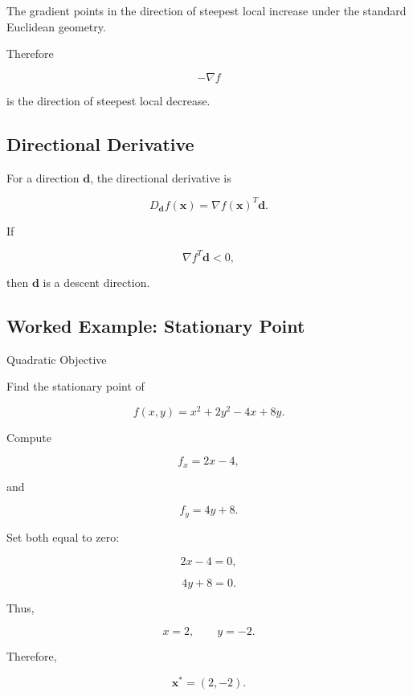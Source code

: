 The gradient points in the direction of steepest local increase under the
standard Euclidean geometry.

Therefore

\[
\boxed{
-\nabla f
}
\]

is the direction of steepest local decrease.

\subsection{Directional Derivative}
\label{subsec:optimization-directional-derivative}

For a direction \(\mathbf{d}\), the directional derivative is

\[
\boxed{
D_{\mathbf{d}}f(\mathbf{x})
=
\nabla f(\mathbf{x})^T\mathbf{d}.
}
\]

If

\[
\nabla f^T\mathbf{d}<0,
\]

then \(\mathbf{d}\) is a descent direction.

\subsection{Worked Example: Stationary Point}
\label{subsec:worked-stationary-point}

\begin{workedexamplebox}{Quadratic Objective}

Find the stationary point of

\[
f(x,y)
=
x^2+2y^2-4x+8y.
\]

Compute

\[
f_x
=
2x-4,
\]

and

\[
f_y
=
4y+8.
\]

Set both equal to zero:

\[
2x-4=0,
\]

\[
4y+8=0.
\]

Thus,

\[
x=2,
\qquad
y=-2.
\]

Therefore,

\begin{answerbox}
\[
\boxed{
\mathbf{x}^*
=
(2,-2).
}
\]
\end{answerbox}

\end{workedexamplebox}

